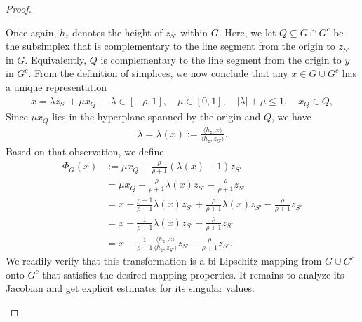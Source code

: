 \documentclass[10pt,a4paper]{article}
\begin{document}
\begin{proof}
\begin{itemize}
        Once again, $h_{z}$ denotes the height of $z_{S'}$ within $G$.
        Here, we let $Q \subseteq G \cap G^{c}$ be the subsimplex 
        that is complementary to the line segment from the origin to $z_{S'}$ in $G$.
        Equivalently, $Q$ is complementary to the line segment from the origin to $y$ in $G^{c}$.
        From the definition of simplices, we now conclude that any $x \in G \cup G^{c}$ 
        has a unique representation
        \begin{align*}
            x = \lambda z_{S'} + \mu x_{Q}, \quad \lambda \in [-\rho,1], \quad \mu \in [0,1], \quad |\lambda| + \mu \leq 1, \quad x_{Q} \in Q,
        \end{align*}
        Since $\mu x_{Q}$ lies in the hyperplane spanned by the origin and $Q$, we have 
        \begin{align*}
            \lambda = \lambda(x) := \frac{\langle h_{z},x\rangle}{\langle h_{z},z_{S'}\rangle} 
            .
        \end{align*}
        Based on that observation, we define 
        \begin{align*}
            \Phi_{G}(x) 
            &
            := 
            \mu x_{Q} + \frac{\rho}{\rho+1} \left( \lambda(x) - 1 \right) z_{S'}
            \\&
            = 
            \mu x_{Q} + \frac{\rho}{\rho+1} \lambda(x) z_{S'} - \frac{\rho}{\rho+1} z_{S'}
            \\&
            = 
            x - \frac{\rho+1}{\rho+1} \lambda(x) z_{S'} + \frac{\rho}{\rho+1} \lambda(x) z_{S'} - \frac{\rho}{\rho+1} z_{S'}
            \\&
            = 
            x - \frac{1}{\rho+1} \lambda(x) z_{S'} - \frac{\rho}{\rho+1} z_{S'}
            \\&
            = 
            x - \frac{1}{\rho+1} \frac{\langle h_{z},x\rangle}{\langle h_{z},z_{S'}\rangle} z_{S'} - \frac{\rho}{\rho+1} z_{S'}
            .
        \end{align*}
        We readily verify that this transformation is a bi-Lipschitz mapping from $G \cup G^{c}$ onto $G^{c}$
        that satisfies the desired mapping properties. 
        It remains to analyze its Jacobian and get explicit estimates for its singular values. 
        

\end{itemize}
\end{proof}
\end{document}
